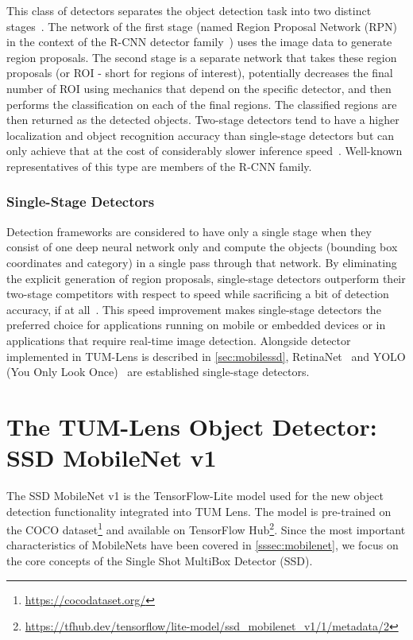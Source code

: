 \documentclass[
			   fontsize=11pt,
               paper=a4,
               bibliography=totoc,
               idxtotoc,
               headsepline,
               footsepline,
               footinclude=false,
               BCOR=12mm,
               DIV=13,
               openany,   %
               ]
               {scrbook}
\begin{document}
This class of detectors separates the object detection task into two distinct stages~\cite{12stageSYNASC2018}. The network of the first stage (named Region Proposal Network (RPN) in the context of the R-CNN detector family~\cite{detectorRCNN}) uses the image data to generate region proposals. The second stage is a separate network that takes these region proposals (or ROI - short for regions of interest), potentially decreases the final number of ROI using mechanics that depend on the specific detector, and then performs the classification on each of the final regions. The classified regions are then returned as the detected objects. Two-stage detectors tend to have a higher localization and object recognition accuracy than single-stage detectors but can only achieve that at the cost of considerably slower inference speed~\cite{surveyICBDT2019}. Well-known representatives of this type are members of the R-CNN family.

\subsubsection{Single-Stage Detectors}

Detection frameworks are considered to have only a single stage when they consist of one deep neural network only and compute the objects (bounding box coordinates and category) in a single pass through that network. By eliminating the explicit generation of region proposals, single-stage detectors outperform their two-stage competitors with respect to speed while sacrificing a bit of detection accuracy, if at all~\cite{detectorSSD}. 
This speed improvement makes single-stage detectors the preferred choice for applications running on mobile or embedded devices or in applications that require real-time image detection. Alongside detector implemented in TUM-Lens is described in \autoref{sec:mobilessd}, RetinaNet~\cite{detectorRetinaNet} and YOLO (You Only Look Once)~\cite{detectorYOLOv4} are established single-stage detectors.


\section{The TUM-Lens Object Detector: SSD MobileNet v1} \label{sec:mobilessd}

The SSD MobileNet v1 is the TensorFlow-Lite model used for the new object detection functionality integrated into TUM Lens. The model is pre-trained on the COCO dataset\footnote{\url{https://cocodataset.org/}} and available on TensorFlow Hub\footnote{\url{https://tfhub.dev/tensorflow/lite-model/ssd_mobilenet_v1/1/metadata/2}}. Since the most important characteristics of MobileNets have been covered in \autoref{sssec:mobilenet}, we focus on the core concepts of the Single Shot MultiBox Detector (SSD). \\
\end{document}
